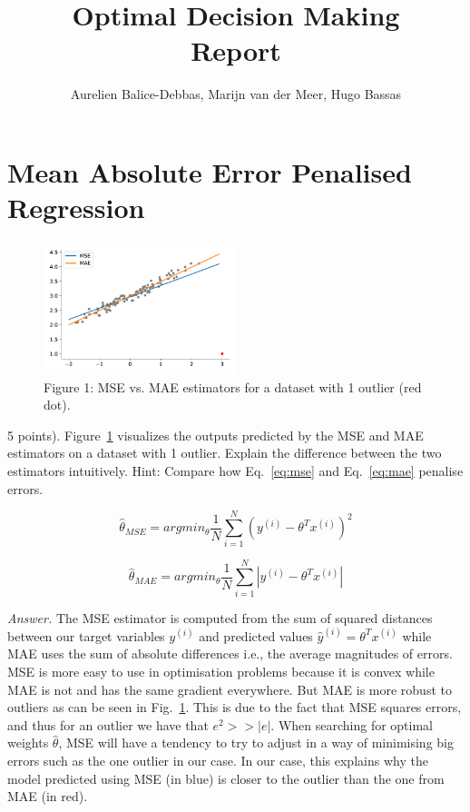 \documentclass[10pt]{article}
\newenvironment{exercise}[2][Exercise]{\begin{trivlist}
  \item[\hskip \labelsep {\bfseries #1}\hskip \labelsep {\bfseries #2.}]}{\end{trivlist}}
\begin{document}
	
  \renewcommand{\qedsymbol}{\smiley}
	\title{Optimal Decision Making \\ Report}
	\author{Aurelien Balice-Debbas, Marijn van der Meer, Hugo Bassas}
	
	\maketitle

\section{Mean Absolute Error Penalised Regression}

\begin{figure}[!ht]
  \centering
  \includegraphics[width=0.5\textwidth]{doc/images/im1_.png}
  \caption{Figure 1: MSE vs. MAE estimators for a dataset with 1 outlier (red dot). }
  \vspace{-3mm}
  \label{fig:mae-mse}
\end{figure}

  \begin{exercise}{1} 
  (5 points).
  Figure~\ref{fig:mae-mse} visualizes the outputs predicted by the MSE
and MAE estimators on a dataset with 1 outlier. Explain the difference between the two estimators intuitively. Hint: Compare how Eq.~\ref{eq:mse} and Eq.~\ref{eq:mae} penalise errors. 

\begin{equation}\label{eq:mse}
    \hat\theta_{MSE} = arg min_\theta \frac{1}{N} \sum_{i=1}^N(y^{(i)}-\theta^Tx^{(i)})^2
\end{equation}

\begin{equation}\label{eq:mae}
    \hat\theta_{MAE} = arg min_\theta  \frac{1}{N} \sum_{i=1}^N|y^{(i)}-\theta^Tx^{(i)}|
\end{equation}


\textit{Answer.} The MSE estimator is computed from the sum of squared distances between our target variables $y^{(i)}$ and predicted values $\hat y^{(i)} = \theta^Tx^{(i)}$ while MAE uses the sum of absolute differences i.e., the average magnitudes of errors. MSE is more easy to use in optimisation problems because it is convex while MAE is not and has the same gradient everywhere. But MAE is more robust to outliers as can be seen in Fig.~\ref{fig:mae-mse}. This is due to the fact that MSE squares errors, and thus for an outlier we have that $e^2 >> |e|$. When searching for optimal weights $\hat\theta$, MSE will have a tendency to try to adjust in a way of minimising big errors such as the one outlier in our case. In our case, this explains why the model predicted using MSE (in blue) is closer to the outlier than the one from MAE (in red). 
  \end{exercise}
\end{document}
